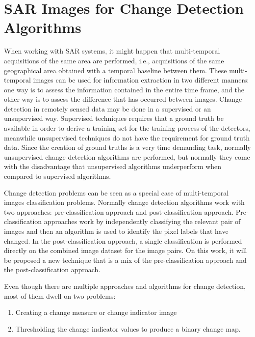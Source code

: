 \section{SAR Images for Change Detection Algorithms}
When working with SAR systems, it might happen that multi-temporal acquisitions of the same area are performed, i.e., acquisitions of the same geographical area obtained with a temporal baseline between them. These multi-temporal images can be used for information extraction in two different manners: one way is to assess the information contained in the entire time frame, and the other way is to assess the difference that has occurred between images\cite{change1}. Change detection in remotely sensed data may be done in a supervised or an unsupervised way. Supervised techniques requires that a ground truth be available in order to derive a training set for the training process of the detectors, meanwhile unsupervised techniques do not have the requirement for ground truth data\cite{change2,change3}. Since the creation of ground truths is a very time demanding task, normally unsupervised change detection algorithms are performed, but normally they come with the disadvantage that unsupervised algorithms underperform when compared to supervised algorithms.

Change detection problems can be seen as a special case of multi-temporal images classification problems. Normally change detection algorithms work with two approaches: pre-classification approach and post-classification approach. Pre-classification approaches work by independently classifying the relevant pair of images and then an algorithm is used to identify the pixel labels that have changed. In the post-classification approach, a single classification is performed directly on the combined image dataset for the image pairs\cite{change4}. On this work, it will be proposed a new technique that is a mix of the pre-classification approach and the post-classification approach.

Even though there are multiple approaches and algorithms for change detection, most of them dwell on two problems\cite{change5}:
\begin{enumerate}
    \item Creating a change measure or change indicator image
    \item Thresholding the change indicator values to produce a binary change map.
\end{enumerate}

